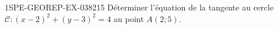 \begin{exercice}{1SPE-GEOREP-EX-038}{2}{15}
Déterminer l'équation de la tangente au cercle $\mathcal{C} : (x-2)^2 + (y-3)^2 = 4$ au point $A(2 ; 5)$.
\end{exercice}
